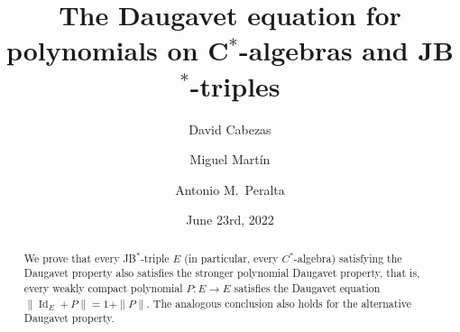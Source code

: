 \documentclass[10pt]{amsart}
\DeclareMathOperator{\id}{Id}
\begin{document}
	
	\title[The polynomial Daugavet property]{The Daugavet equation for polynomials on C$^*$-algebras and JB$^*$-triples}
	
	\author[D.\ Cabezas]{David Cabezas}
	\address[Cabezas]{Departamento de An\'{a}lisis Matem\'{a}tico, Facultad de
		Ciencias, Universidad de Granada, 18071 Granada, Spain.}
	
	
	
	\author[M.\ Mart{\'i}n]{Miguel Mart{\'i}n}
	\address[Mart\'{\i}n]{Instituto de Matem\'{a}ticas de la Universidad de Granada (IMAG). Departamento de An\'{a}lisis Matem\'{a}tico, Facultad de	Ciencias, Universidad de Granada, 18071 Granada, Spain.}
	
	
	
	\author[A.\ M.\ Peralta]{Antonio M.\ Peralta}
	
	\address[Peralta]{Instituto de Matem\'{a}ticas de la Universidad de Granada (IMAG). Departamento de An\'{a}lisis Matem\'{a}tico, Facultad de	Ciencias, Universidad de Granada, 18071 Granada, Spain.}
	
	
	
	
	
	\date{June 23rd, 2022}
	
	\begin{abstract} We prove that every JB$^*$-triple $E$ (in particular, every $C^*$-algebra) satisfying the Daugavet property also satisfies the stronger polynomial Daugavet property, that is, every weakly compact polynomial $P\colon E \longrightarrow E$ satisfies the Daugavet equation $\|\id_{E} + P\| = 1+\|P\|$. The analogous conclusion also holds for the alternative Daugavet property.
	\end{abstract}
	
	\maketitle
	\thispagestyle{empty}
	
\end{document}
